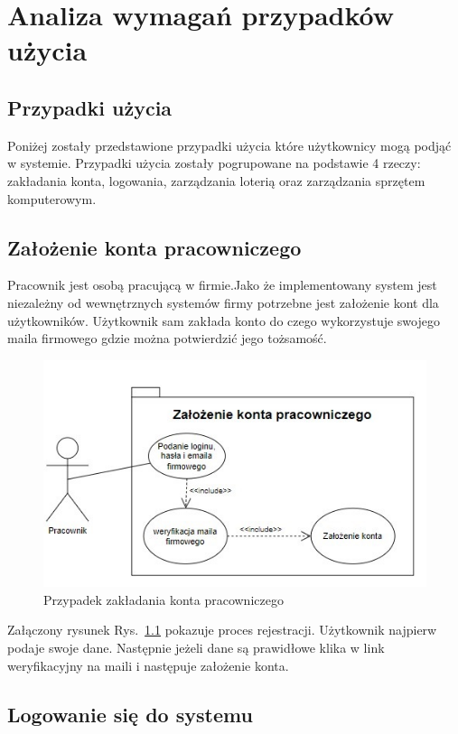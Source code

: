 \chapter{Analiza wymagań przypadków użycia}
\section{Przypadki użycia}
Poniżej zostały przedstawione przypadki użycia które użytkownicy mogą podjąć w systemie. Przypadki użycia zostały pogrupowane na podstawie 4 rzeczy: zakładania konta, logowania, zarządzania loterią oraz zarządzania sprzętem komputerowym.

\section{Założenie konta pracowniczego}
Pracownik jest osobą pracującą w firmie.Jako że implementowany system jest niezależny od wewnętrznych systemów firmy potrzebne jest założenie kont dla użytkowników. Użytkownik sam zakłada konto do czego wykorzystuje swojego maila firmowego gdzie można potwierdzić jego tożsamość.

\begin{figure}[h]
    \includegraphics{rys01/zakladanie.jpg}
    \caption{Przypadek zakładania konta pracowniczego}
    \label{zakładanie_konta_etykieta}
\end{figure}

Załączony rysunek Rys.~\ref{zakładanie_konta_etykieta} pokazuje proces rejestracji. Użytkownik najpierw podaje swoje dane. Następnie jeżeli dane są prawidłowe klika w link weryfikacyjny na maili i następuje założenie konta.

\section{Logowanie się do systemu}


